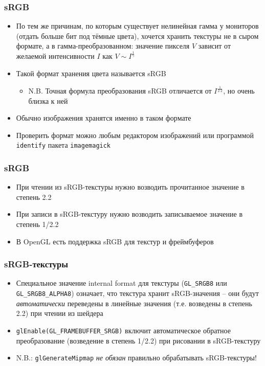 \documentclass{beamer}
\begin{document}
\begin{frame}[fragile]
\frametitle{sRGB}
\begin{itemize}
\item По тем же причинам, по которым существует нелинейная гамма у мониторов (отдать больше бит под тёмные цвета), хочется хранить текстуры не в сыром формате, а в гамма-преобразованном: значение пикселя \begin{math}V\end{math} зависит от желаемой интенсивности \begin{math}I\end{math} как \begin{math}V \sim I^\frac{1}{\gamma}\end{math}
\pause
\item Такой формат хранения цвета называется sRGB
\begin{itemize}
\item N.B. Точная формула преобразования sRGB отличается от \begin{math}I^\frac{1}{2.2}\end{math}, но очень близка к ней
\end{itemize}
\pause
\item Обычно изображения хранятся именно в таком формате
\pause
\item Проверить формат можно любым редактором изображений или программой \verb|identify| пакета \verb|imagemagick|
\end{itemize}
\end{frame}

\begin{frame}[fragile]
\frametitle{sRGB}
\begin{itemize}
\item При чтении из sRGB-текстуры нужно возводить прочитанное значение в степень 2.2
\pause
\item При записи в sRGB-текстуру нужно возводить записываемое значение в степень 1/2.2
\pause
\item В OpenGL есть поддержка sRGB для текстур и фреймбуферов
\end{itemize}
\end{frame}

\begin{frame}[fragile]
\frametitle{sRGB-текстуры}
\begin{itemize}
\item Специальное значение internal format для текстуры (\verb|GL_SRGB8| или \verb|GL_SRGB8_ALPHA8|) означает, что текстура хранит sRGB-значения -- они будут \textit{автоматически} переведены в линейные значения (т.е. возведены в степень 2.2) при чтении из шейдера
\pause
\item \verb|glEnable(GL_FRAMEBUFFER_SRGB)| включит автоматическое обратное преобразование (возведение в степень 1/2.2) при рисовании в sRGB-текстуру
\pause
\item {\color{red}N.B.:} \verb|glGenerateMipmap| \textit{не обязан} правильно обрабатывать sRGB-текстуры!
\end{itemize}
\end{frame}
\end{document}
